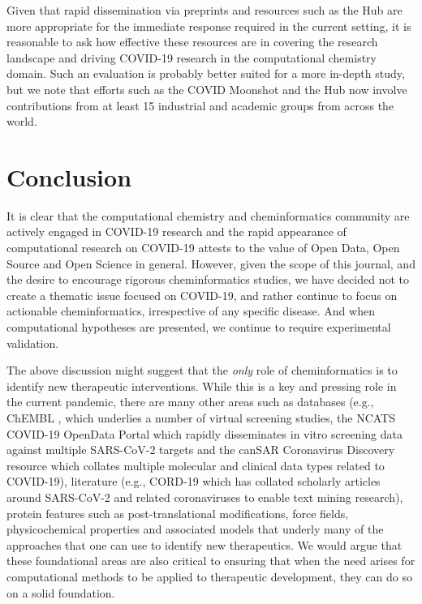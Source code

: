 \documentclass{bmcart}
\begin{document}
Given that rapid dissemination via preprints and resources such as the
Hub are more appropriate for the immediate response required in the
current setting, it is reasonable to ask how effective these resources
are in covering the research landscape and driving COVID-19 research
in the computational chemistry domain. Such an evaluation is probably
better suited for a more in-depth study, but we note that
efforts such as the COVID Moonshot and the Hub now involve
contributions from at least 15 industrial and academic groups from across
the world.

\section*{Conclusion}

It is clear that the computational chemistry and cheminformatics
community are actively engaged in COVID-19 research and the rapid
appearance of computational research \cite{jcim_covid_editorial} on
COVID-19 attests to the value of Open Data, Open Source and Open
Science in general. However, given the scope of this journal, and the
desire to encourage rigorous cheminformatics studies, we have decided
not to create a thematic issue focused on COVID-19, and rather
continue to focus on actionable cheminformatics, irrespective of any
specific disease. And when computational hypotheses are presented, we
continue to require experimental validation.

The above discussion might suggest that the \emph{only} role of
cheminformatics is to identify new therapeutic interventions. While
this is a key and pressing role in the current pandemic, there are
many other areas such as databases (e.g., ChEMBL \cite{chembl}, which
underlies a number of virtual screening studies, the NCATS COVID-19
OpenData Portal \cite{covid-ncats-paper} which rapidly disseminates in
vitro screening data against multiple SARS-CoV-2 targets and the
canSAR Coronavirus Discovery resource \cite{covid-cansar} which
collates multiple molecular and clinical data types related to
COVID-19), literature (e.g., CORD-19 \cite{covid-cord19} which has
collated scholarly articles around SARS-CoV-2 and related
coronaviruses to enable text mining research), protein features such
as post-translational modifications, force fields, physicochemical
properties and associated models that underly many of the approaches
that one can use to identify new therapeutics. We would argue that
these foundational areas are also critical to ensuring that when the
need arises for computational methods to be applied to therapeutic
development, they can do so on a solid foundation.
\end{document}

